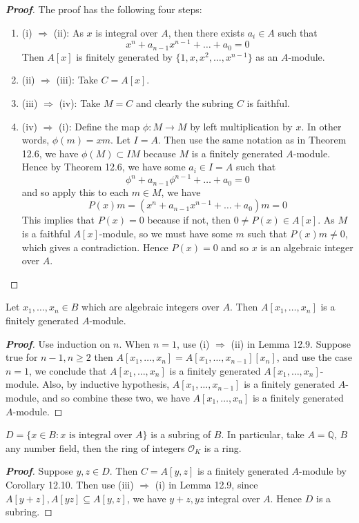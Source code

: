\begin{proof}[\bf Proof] The proof has the following four steps:
\begin{enumerate}
\item (i) $\Rightarrow$ (ii): As $x$ is integral over $A$, then there exists $a_i \in A$ such that
$$x^n+a_{n-1}x^{n-1}+\ldots+a_0 =0$$
Then $A[x]$ is finitely generated by $\{1,x,x^2,\ldots,x^{n-1}\}$ as an $A$-module.
\item (ii) $\Rightarrow$ (iii): Take $C=A[x]$.
\item (iii) $\Rightarrow$ (iv): Take $M=C$ and clearly the subring $C$ is faithful.
\item (iv) $\Rightarrow$ (i): Define the map $\phi: M \rightarrow M$ by left multiplication by $x$. In other words, $\phi(m)=xm$. Let $I=A$. Then use the same notation as in Theorem 12.6, we have $\phi(M) \subset IM$ because $M$ is a finitely generated $A$-module. Hence by Theorem 12.6, we have some $a_i \in I=A$ such that
    $$\phi^n+a_{n-1}\phi^{n-1}+\ldots+a_0=0$$
    and so apply this to each $m \in M$, we have
    $$P(x)m=(x^n +a_{n-1} x^{n-1}+\ldots+a_0)m=0$$
    This implies that $P(x)=0$ because if not, then $0 \neq P(x) \in A[x]$. As $M$ is a faithful $A[x]$-module, so we must have some $m$ such that $P(x) m \neq 0$, which gives a contradiction. Hence $P(x)=0$ and so
    $x$ is an algebraic integer over $A$.
\end{enumerate}
\end{proof}
\begin{corollary} Let $x_1,\ldots,x_n \in B$ which are algebraic integers over $A$. Then $A[x_1,\ldots,x_n]$ is a finitely generated $A$-module.
\end{corollary}
\begin{proof}[\bf Proof] Use induction on $n$. When $n=1$, use (i) $\Rightarrow$ (ii) in Lemma 12.9.
Suppose true for $n-1, n \ge 2$ then $A[x_1,\ldots,x_n]=A[x_1,\ldots,x_{n-1}][x_n]$, and use the case $n=1$, we conclude that $A[x_1,\ldots,x_n]$ is a finitely generated $A[x_1,\ldots,x_n]$-module.
Also, by inductive hypothesis, $A[x_1,\ldots,x_{n-1}]$ is a finitely generated $A$-module, and so combine these two, we have $A[x_1,\ldots,x_n]$ is a finitely generated $A$-module.
\end{proof}
\begin{corollary} $D=\{x \in B: x \text{ is integral over } A\}$ is a subring of $B$. In particular, take $A=\mathbb{Q}$, $B$ any number field, then the ring of integers $\mathcal{O}_K$ is a ring.
\end{corollary}
\begin{proof}[\bf Proof] Suppose $y,z \in D$. Then $C=A[y,z]$ is a finitely generated $A$-module by Corollary 12.10. Then use
(iii) $\Rightarrow$ (i) in Lemma 12.9, since $A[y+z],A[yz] \subseteq A[y,z]$, we have $y+z, yz$ integral over $A$.
Hence $D$ is a subring.
\end{proof}
